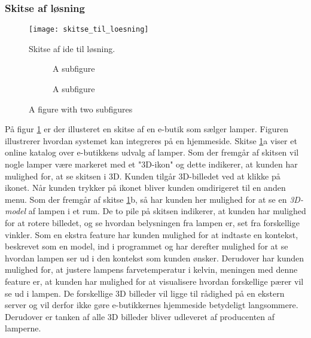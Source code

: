 \subsubsection{Skitse af løsning}

\begin{figure}[H]
   \centering
   \texttt{[image: skitse\_til\_loesning]}
   \caption{Skitse af ide til løsning.}
   \label{fig:skitse_af_ide}
\end{figure}

\begin{figure}
\centering
\begin{subfigure}{.5\textwidth}
  \centering
  \caption{A subfigure}
  \label{fig:sub1}
\end{subfigure}%
\begin{subfigure}{.5\textwidth}
  \centering
  \caption{A subfigure}
  \label{fig:sub2}
\end{subfigure}
\caption{A figure with two subfigures}
\label{fig:test}
\end{figure}


På figur \ref{fig:skitse_af_ide} er der illusteret en skitse af en e-butik som sælger lamper. Figuren illustrerer hvordan systemet kan integreres på en hjemmeside. Skitse \ref{fig:skitse_af_ide}a viser et online katalog over e-butikkens udvalg af lamper. Som der fremgår af skitsen vil nogle lamper være markeret med et "3D-ikon" og dette indikerer, at kunden har mulighed for, at se skitsen i 3D. Kunden tilgår 3D-billedet ved at klikke på ikonet. Når kunden trykker på ikonet bliver kunden omdirigeret til en anden menu. Som der fremgår af skitse \ref{fig:skitse_af_ide}b, så har kunden her mulighed for at se en \textit{3D-model} af lampen i et rum. De to pile på skitsen indikerer, at kunden har mulighed for at rotere billedet, og se hvordan belysningen fra lampen er, set fra forskellige vinkler. Som en ekstra feature har kunden mulighed for at indtaste en kontekst, beskrevet som en model, ind i programmet og har derefter mulighed for at se hvordan lampen ser ud i den kontekst som kunden ønsker. 
Derudover har kunden mulighed for, at justere lampens farvetemperatur i kelvin, meningen med denne feature er, at kunden har mulighed for at visualisere hvordan forskellige pærer vil se ud i lampen. De forskellige 3D billeder vil ligge til rådighed på en ekstern server og vil derfor ikke gøre e-butikkernes hjemmeside betydeligt langsommere. Derudover er tanken af alle 3D billeder bliver udleveret af producenten af lamperne. 

